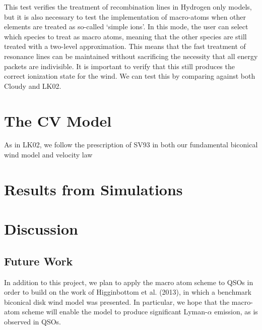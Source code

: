 \documentclass[usenatbib, a4paper]{mn2e}
\begin{document}
This test verifies the treatment of recombination lines in Hydrogen only models, but it is also necessary to test the implementation
of macro-atoms when other elements are treated as so-called `simple ions'. In this mode, the user can select which species to treat as
macro atoms, meaning that the other species are still treated with a two-level approximation. This means that the fast treatment of
resonance lines can be maintained without sacrificing the necessity that all energy packets are indivisible. It is important to verify that 
this still produces the correct ionization state for the wind. We can test this by comparing against both {\textsc Cloudy} and LK02.



%
%

\section{The CV Model}
As in LK02, we follow the prescription of SV93 in both our fundamental biconical wind model and velocity law


%
%

\section{Results from Simulations}


%
%


\section{Discussion}



\subsection{Future Work}

In addition to this project, we plan to apply the macro atom scheme to QSOs in order to build on the work of Higginbottom et al. (2013),
in which a benchmark biconical disk wind model was presented. In particular, we hope that the macro-atom scheme will enable the
model to produce significant Lyman-$\alpha$ emission, as is observed in QSOs.





\end{document}
